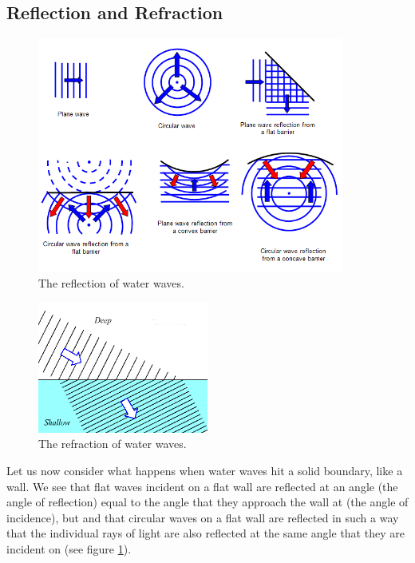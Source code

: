 \documentclass[a4paper]{amsbook}
\newcommand\capcite[1]{}
\begin{document}
\subsection{Reflection and Refraction}
\begin{figure}
  \centering
  \includegraphics[width=0.9\textwidth]{waterreflect}
  \caption{The reflection of water waves. \capcite{http://www.schoolphysics.co.uk/age16-19/Wave\%20properties/Wave\%20properties/text/Wave_reflection_and_refraction/images/1.png}\label{fig:watreflect}}
\end{figure}
\begin{figure}
  \centering
  \includegraphics[width=0.5\textwidth]{refraction}
  \caption{The refraction of water waves. \capcite{http://www.school-for-champions.com/science/images/waves_obstacles_refraction.gif}\label{fig:refraction}}
\end{figure}
Let us now consider what happens when water waves hit a solid boundary, like a wall. We see that flat waves incident on a flat wall are reflected
at an angle (the angle of reflection) equal to the angle that they approach the wall at (the angle of incidence), but and that circular waves
on a flat wall are reflected in such a way that the individual rays of light are also reflected at the same angle that they are incident on
(see figure \ref{fig:watreflect}).
\end{document}
